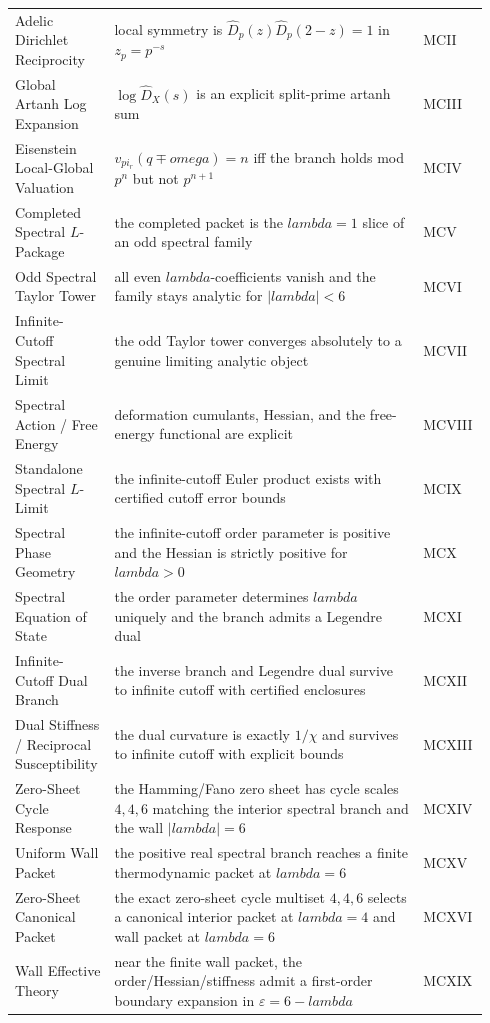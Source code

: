 \documentclass[11pt]{article}
\def\omega{omega}%
\def\lambda{lambda}%
\def\pi{pi}%
\begin{document}
{\begin{longtable}{>{\raggedright\arraybackslash}p{0.18\linewidth} >{\raggedright\arraybackslash}p{0.63\linewidth} >{\raggedright\arraybackslash}p{0.13\linewidth}}
Adelic Dirichlet Reciprocity & local symmetry is $\widehat D_p(z)\widehat D_p(2-z)=1$ in $z_p=p^{-s}$ & MCII \\
Global Artanh Log Expansion & $\log\widehat D_X(s)$ is an explicit split-prime artanh sum & MCIII \\
Eisenstein Local-Global Valuation & $v_{\pi_r}(q\mp\omega)=n$ iff the branch holds mod $p^n$ but not $p^{n+1}$ & MCIV \\
Completed Spectral $L$-Package & the completed packet is the $\lambda=1$ slice of an odd spectral family & MCV \\
Odd Spectral Taylor Tower & all even $\lambda$-coefficients vanish and the family stays analytic for $|\lambda|<6$ & MCVI \\
Infinite-Cutoff Spectral Limit & the odd Taylor tower converges absolutely to a genuine limiting analytic object & MCVII \\
Spectral Action / Free Energy & deformation cumulants, Hessian, and the free-energy functional are explicit & MCVIII \\
Standalone Spectral $L$-Limit & the infinite-cutoff Euler product exists with certified cutoff error bounds & MCIX \\
Spectral Phase Geometry & the infinite-cutoff order parameter is positive and the Hessian is strictly positive for $\lambda>0$ & MCX \\
Spectral Equation of State & the order parameter determines $\lambda$ uniquely and the branch admits a Legendre dual & MCXI \\
Infinite-Cutoff Dual Branch & the inverse branch and Legendre dual survive to infinite cutoff with certified enclosures & MCXII \\
Dual Stiffness / Reciprocal Susceptibility & the dual curvature is exactly $1/\chi$ and survives to infinite cutoff with explicit bounds & MCXIII \\
Zero-Sheet Cycle Response & the Hamming/Fano zero sheet has cycle scales $4,4,6$ matching the interior spectral branch and the wall $|\lambda|=6$ & MCXIV \\
Uniform Wall Packet & the positive real spectral branch reaches a finite thermodynamic packet at $\lambda=6$ & MCXV \\
Zero-Sheet Canonical Packet & the exact zero-sheet cycle multiset $4,4,6$ selects a canonical interior packet at $\lambda=4$ and wall packet at $\lambda=6$ & MCXVI \\
Wall Effective Theory & near the finite wall packet, the order/Hessian/stiffness admit a first-order boundary expansion in $\varepsilon=6-\lambda$ & MCXIX \\

\end{longtable}}
\end{document}
